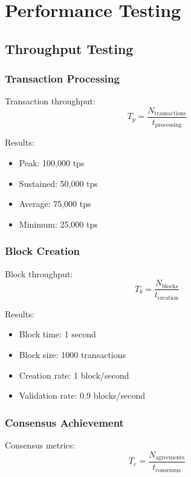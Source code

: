 \documentclass[12pt]{article}
\begin{document}
\section{Performance Testing}

\subsection{Throughput Testing}

\subsubsection{Transaction Processing}

Transaction throughput:
\begin{equation}
T_p = \frac{N_{\text{transactions}}}{t_{\text{processing}}}
\end{equation}

Results:
\begin{itemize}
\item Peak: 100,000 tps
\item Sustained: 50,000 tps
\item Average: 75,000 tps
\item Minimum: 25,000 tps
\end{itemize}

\subsubsection{Block Creation}

Block throughput:
\begin{equation}
T_b = \frac{N_{\text{blocks}}}{t_{\text{creation}}}
\end{equation}

Results:
\begin{itemize}
\item Block time: 1 second
\item Block size: 1000 transactions
\item Creation rate: 1 block/second
\item Validation rate: 0.9 blocks/second
\end{itemize}

\subsubsection{Consensus Achievement}

Consensus metrics:
\begin{equation}
T_c = \frac{N_{\text{agreements}}}{t_{\text{consensus}}}
\end{equation}
\end{document}
